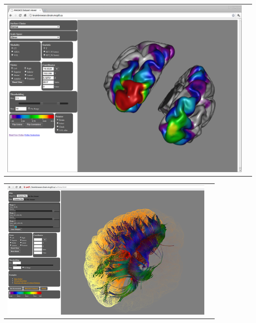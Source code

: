 \documentclass[a4shrink]{baposter}
\begin{document}
\begin{poster}
{\begin{center}
  \begin{tabular}{cc}
    \includegraphics[width=.9\linewidth]{macacc.png}
  \end{tabular}
\end{center}
\begin{center}
  \begin{tabular}{cc}
    \includegraphics[width=.9\linewidth]{brainbrowser.png}
  \end{tabular}
\end{center}

}



\end{poster}
\end{document}
